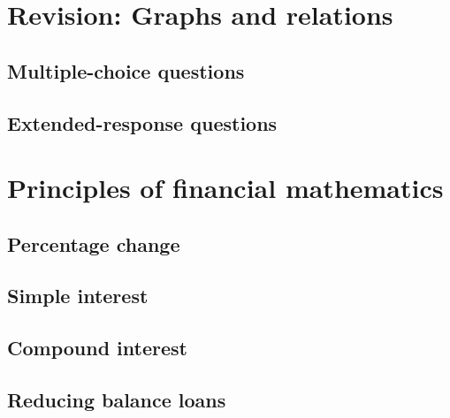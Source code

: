 \documentclass[a4paper,11pt]{article}
\begin{document}
\newpage

\section{Revision: Graphs and relations}
\begin{outline}

\0
\subsection{Multiple-choice questions}

\0
\subsection{Extended-response questions}

\end{outline}

\newpage

\section{Principles of financial mathematics}
\begin{outline}

\0
\subsection{Percentage change}

\0
\subsection{Simple interest}

\0
\subsection{Compound interest}

\0
\subsection{Reducing balance loans}

\end{outline}

\newpage
\end{document}
